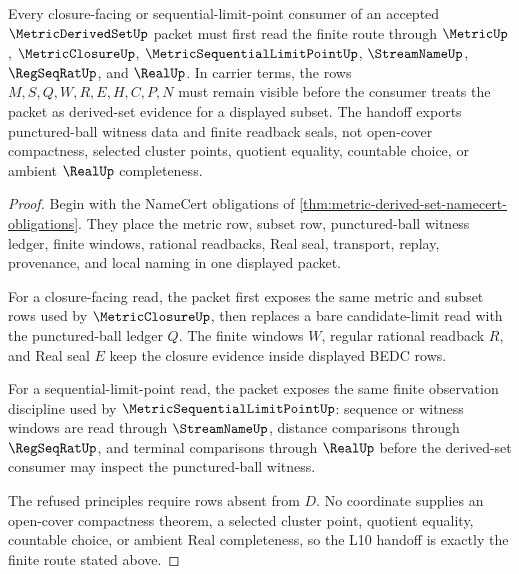 \begin{theorem}
\label{thm:metric-derived-set-l10-handoff}
Every closure-facing or sequential-limit-point consumer of an accepted $\MetricDerivedSetUp$ packet must first read the finite route through $\MetricUp$, $\MetricClosureUp$, $\MetricSequentialLimitPointUp$, $\StreamNameUp$, $\RegSeqRatUp$, and $\RealUp$. In carrier terms, the rows $M,S,Q,W,R,E,H,C,P,N$ must remain visible before the consumer treats the packet as derived-set evidence for a displayed subset. The handoff exports punctured-ball witness data and finite readback seals, not open-cover compactness, selected cluster points, quotient equality, countable choice, or ambient $\RealUp$ completeness.
\end{theorem}
\begin{proof}
Begin with the NameCert obligations of \autoref{thm:metric-derived-set-namecert-obligations}. They place the metric row, subset row, punctured-ball witness ledger, finite windows, rational readbacks, Real seal, transport, replay, provenance, and local naming in one displayed packet.

For a closure-facing read, the packet first exposes the same metric and subset rows used by $\MetricClosureUp$, then replaces a bare candidate-limit read with the punctured-ball ledger $Q$. The finite windows $W$, regular rational readback $R$, and Real seal $E$ keep the closure evidence inside displayed BEDC rows.

For a sequential-limit-point read, the packet exposes the same finite observation discipline used by $\MetricSequentialLimitPointUp$: sequence or witness windows are read through $\StreamNameUp$, distance comparisons through $\RegSeqRatUp$, and terminal comparisons through $\RealUp$ before the derived-set consumer may inspect the punctured-ball witness.

The refused principles require rows absent from $D$. No coordinate supplies an open-cover compactness theorem, a selected cluster point, quotient equality, countable choice, or ambient Real completeness, so the L10 handoff is exactly the finite route stated above.
\end{proof}


